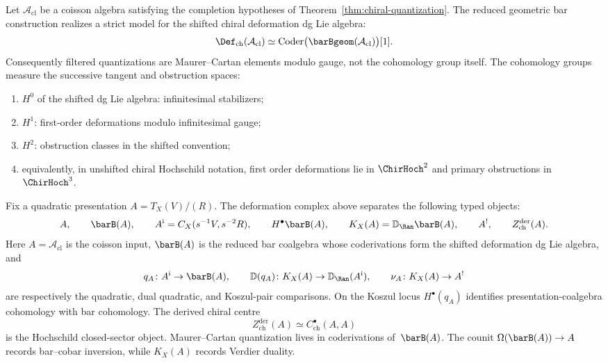 \begin{theorem}
\label{thm:bar-computes-deformation}
Let $\mathcal A_{\mathrm{cl}}$ be a coisson algebra satisfying the
completion hypotheses of Theorem~\ref{thm:chiral-quantization}. The
reduced geometric bar construction realizes a strict model for the
shifted chiral deformation dg Lie algebra:
\[
\Def_{\mathrm{ch}}(\mathcal A_{\mathrm{cl}})
\simeq
\operatorname{Coder}\bigl(\barBgeom(\mathcal A_{\mathrm{cl}})\bigr)[1].
\]
Consequently filtered quantizations are Maurer--Cartan elements modulo
gauge, not the cohomology group itself. The cohomology groups measure
the successive tangent and obstruction spaces:
\begin{enumerate}
\item $H^0$ of the shifted dg Lie algebra: infinitesimal stabilizers;
\item $H^1$: first-order deformations modulo infinitesimal gauge;
\item $H^2$: obstruction classes in the shifted convention;
\item equivalently, in unshifted chiral Hochschild notation, first
 order deformations lie in $\ChirHoch^2$ and primary obstructions in
 $\ChirHoch^3$.
\end{enumerate}
\end{theorem}

\begin{remark}
\label{rem:defq-object-firewall}
Fix a quadratic presentation $A=T_X(V)/(R)$.  The deformation complex
above separates the following typed objects:
\[
A,\qquad \barB(A),\qquad
A^{\mathrm i}=C_X(s^{-1}V,s^{-2}R),\qquad
H^\bullet\barB(A),\qquad
K_X(A)=\mathbb D_{\Ran}\barB(A),\qquad A^!,\qquad
Z^{\mathrm{der}}_{\mathrm{ch}}(A).
\]
Here \(A=\mathcal A_{\mathrm{cl}}\) is the coisson input,
\(\barB(A)\) is the reduced bar coalgebra whose coderivations form the
shifted deformation dg Lie algebra, and
\[
q_A\colon A^{\mathrm i}\to\barB(A),\qquad
\mathbb D(q_A)\colon K_X(A)\to\mathbb D_{\Ran}(A^{\mathrm i}),
\qquad
\nu_A\colon K_X(A)\to A^!
\]
are respectively the quadratic, dual quadratic, and Koszul-pair
comparisons.  On the Koszul locus $H^\bullet(q_A)$ identifies
presentation-coalgebra cohomology with bar cohomology. The derived chiral centre
\[
Z^{\mathrm{der}}_{\mathrm{ch}}(A)
\simeq C^\bullet_{\mathrm{ch}}(A,A)
\]
is the Hochschild closed-sector object. Maurer--Cartan quantization
lives in coderivations of~\(\barB(A)\).  The counit
\(\Omega(\barB(A))\to A\) records bar--cobar inversion, while
\(K_X(A)\) records Verdier duality.
\end{remark}

